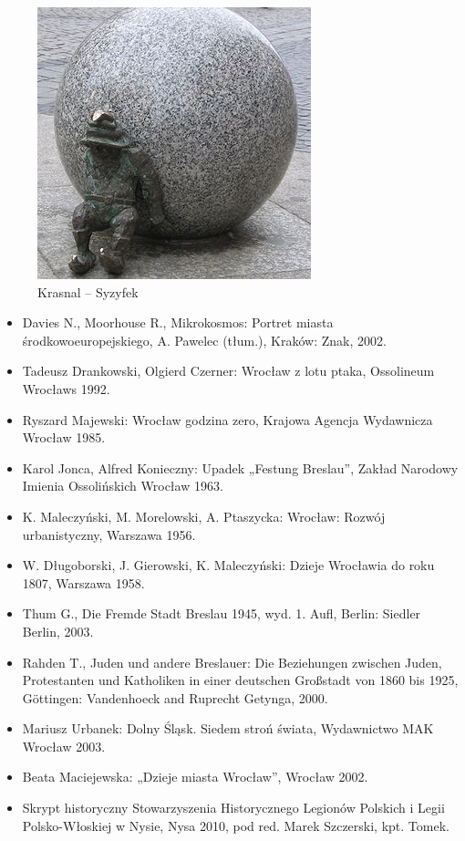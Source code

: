 \documentclass{article}
\begin{document}
\begin{figure}[htbp!]
\centering
\includegraphics[scale=0.7]{20.jpg}
\caption{Krasnal – Syzyfek}
\label{fig:18}
\end{figure}

\newpage


\begin{itemize}
\item Davies N., Moorhouse R., Mikrokosmos: Portret miasta środkowoeuropejskiego, A. Pawelec (tłum.), Kraków: Znak, 2002.
\item Tadeusz Drankowski, Olgierd Czerner: Wrocław z lotu ptaka, Ossolineum Wrocławs 1992.
\item Ryszard Majewski: Wrocław godzina zero, Krajowa Agencja Wydawnicza Wrocław 1985.
\item Karol Jonca, Alfred Konieczny: Upadek „Festung Breslau”, Zakład Narodowy Imienia Ossolińskich Wrocław 1963.
\item K. Maleczyński, M. Morelowski, A. Ptaszycka: Wrocław: Rozwój urbanistyczny, Warszawa 1956.
\item W. Długoborski, J. Gierowski, K. Maleczyński: Dzieje Wrocławia do roku 1807, Warszawa 1958.
\item Thum G., Die Fremde Stadt Breslau 1945, wyd. 1. Aufl, Berlin: Siedler Berlin, 2003.
\item Rahden T., Juden und andere Breslauer: Die Beziehungen zwischen Juden, Protestanten und Katholiken in einer deutschen Großstadt von 1860 bis 1925, Göttingen: Vandenhoeck and Ruprecht Getynga, 2000.
\item Mariusz Urbanek: Dolny Śląsk. Siedem stroń świata, Wydawnictwo MAK Wrocław 2003.
\item Beata Maciejewska: „Dzieje miasta Wrocław”, Wrocław 2002.
\item Skrypt historyczny Stowarzyszenia Historycznego Legionów Polskich i Legii Polsko-Włoskiej w Nysie, Nysa 2010, pod red. Marek Szczerski, kpt. Tomek.
\end{itemize}
\end{document}
